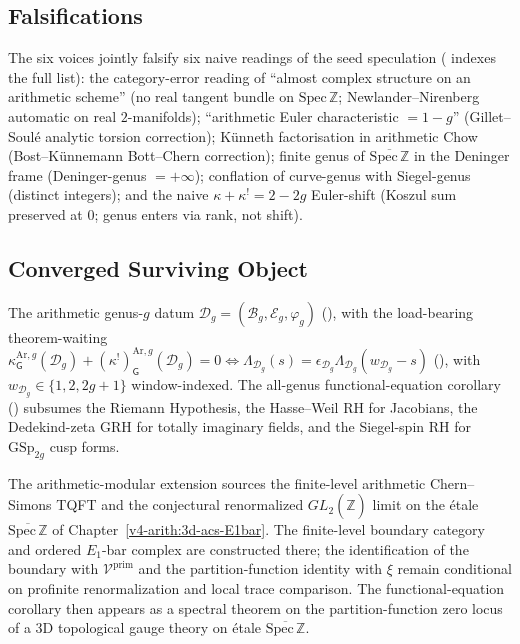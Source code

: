 \subsection{Falsifications}
\label{v4-arith:app:B:genus-g:falsifications}

The six voices jointly falsify six naive readings of the seed
speculation ( indexes the full list):
the category-error reading of ``almost complex structure on an
arithmetic scheme'' (no real tangent bundle on \(\mathrm{Spec}\,\mathbb{Z}\);
Newlander--Nirenberg automatic on real \(2\)-manifolds); ``arithmetic
Euler characteristic $=1-g$'' (Gillet--Soul\'e analytic torsion
correction); K\"unneth factorisation in arithmetic Chow (Bost--K\"unnemann
Bott--Chern correction); finite genus of $\overline{\mathrm{Spec}\,\mathbb{Z}}$
in the Deninger frame (Deninger-genus $=+\infty$); conflation of
curve-genus with Siegel-genus (distinct integers); and the naive
$\kappa+\kappa^{!}=2-2g$ Euler-shift (Koszul sum preserved at $0$;
genus enters via rank, not shift).

\subsection{Converged Surviving Object}
\label{v4-arith:app:B:genus-g:converged}

The arithmetic genus-\(g\) datum \(\mathcal{D}_g=(\mathcal{B}_g,\mathcal{E}_g,\varphi_g)\)
(), with the load-bearing theorem-waiting
\(\kappa^{\mathrm{Ar},g}_{\mathsf{G}}(\mathcal{D}_g)+(\kappa^{!})^{\mathrm{Ar},g}_{\mathsf{G}}(\mathcal{D}_g)=0\Leftrightarrow\Lambda_{\mathcal{D}_g}(s)=\epsilon_{\mathcal{D}_g}\Lambda_{\mathcal{D}_g}(w_{\mathcal{D}_g}-s)\)
(), with
\(w_{\mathcal{D}_g}\in\{1,2,2g+1\}\) window-indexed. The all-genus functional-equation corollary
() subsumes the Riemann
Hypothesis, the Hasse--Weil RH for Jacobians, the Dedekind-zeta
GRH for totally imaginary fields, and the Siegel-spin RH for
$\mathrm{GSp}_{2g}$ cusp forms.

The arithmetic-modular extension sources the finite-level
arithmetic Chern--Simons TQFT and the conjectural renormalized
$GL_{2}(\widehat{\mathbb{Z}})$ limit on the \'etale
$\overline{\mathrm{Spec}\,\mathbb{Z}}$ of
Chapter~\ref{v4-arith:3d-acs-E1bar}. The finite-level boundary
category and ordered $E_{1}$-bar complex are constructed there;
the identification of the boundary with $\mathcal{V}^{\mathrm{prim}}$
and the partition-function identity with $\xi$ remain conditional
on profinite renormalization and local trace comparison. The
functional-equation corollary then appears as a spectral theorem
on the partition-function zero locus of a 3D topological gauge
theory on \'etale $\overline{\mathrm{Spec}\,\mathbb{Z}}$.

